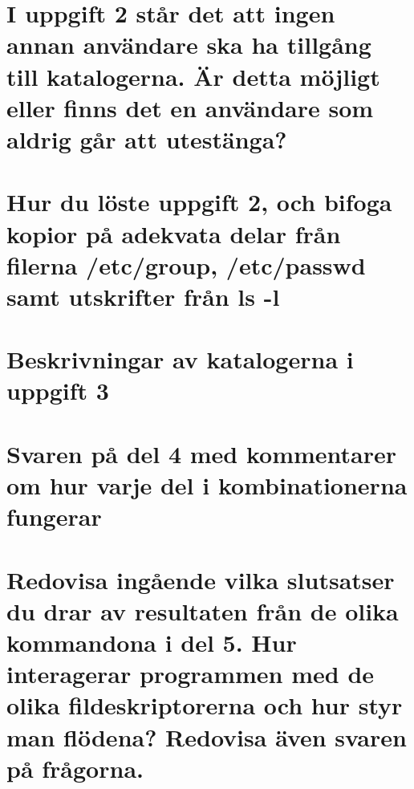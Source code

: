 \documentclass[11pt]{article}
\begin{document}
\section{I uppgift 2 står det att ingen annan användare ska ha tillgång till katalogerna. Är detta möjligt eller finns det en användare som aldrig går att utestänga?}
\lipsum[56]

\section{Hur du löste uppgift 2, och bifoga kopior på adekvata delar från filerna /etc/group, /etc/passwd samt utskrifter från ls -l}
\lipsum[56]
     
\section{Beskrivningar av katalogerna i uppgift 3}
\lipsum[56]

\section{Svaren på del 4 med kommentarer om hur varje del i kombinationerna fungerar}
\lipsum[56]

\section{Redovisa ingående vilka slutsatser du drar av resultaten från de olika kommandona i del 5. Hur interagerar programmen med de olika fildeskriptorerna och hur styr man flödena? Redovisa även svaren på frågorna.}
\lipsum[56]
\end{document}
